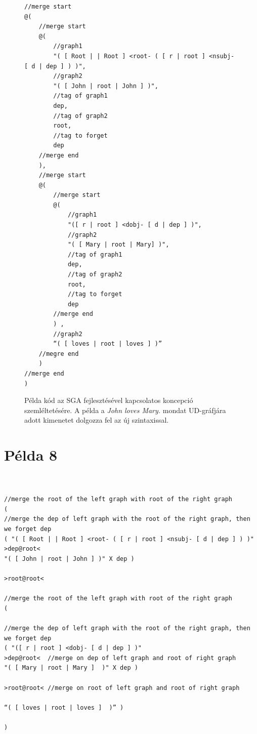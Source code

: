 \begin{figure}[h]
\begin{verbatim}
//merge start
@(																				
	//merge start
	@(																			
		//graph1
		"( [ Root | | Root ] <root- ( [ r | root ] <nsubj- [ d | dep ] ) )",	
		//graph2
	 	"( [ John | root | John ] )",
	 	//tag of graph1
		dep,							
		//tag of graph2
		root,						
		//tag to forget	
		dep							
	//merge end
	),								
	//merge start
 	@(								
 		//merge start
		@(							
			//graph1
			"([ r | root ] <dobj- [ d | dep ] )", 		
			//graph2	
			"( [ Mary | root | Mary] )",
			//tag of graph1				
			dep,						
			//tag of graph2
			root,					
			//tag to forget	
			dep						
		//merge end
		) ,							
		//graph2
		“( [ loves | root | loves ] )”
	//megre end					
	)								
//merge end
)									
\end{verbatim}
\caption{Példa kód az SGA fejlesztésével kapcsolatos koncepció szemléltetésére.
			A példa a \textit{John loves Mary.} mondat UD-gráfjára adott kimenetet dolgozza fel az új szintaxissal.}
\label{cod:example7}
\end{figure}



\section{Példa 8}
\label{sec:example8}

\begin{verbatim}


//merge the root of the left graph with root of the right graph
( 
//merge the dep of left graph with the root of the right graph, then we forget dep
( "( [ Root | | Root ] <root- ( [ r | root ] <nsubj- [ d | dep ] ) )" 
>dep@root< 
"( [ John | root | John ] )" X dep ) 

>root@root<

//merge the root of the left graph with root of the right graph
( 

//merge the dep of left graph with the root of the right graph, then we forget dep
( "([ r | root ] <dobj- [ d | dep ] )" 
>dep@root< 	//merge on dep of left graph and root of right graph
"( [ Mary | root | Mary ]  )" X	dep ) 

>root@root<	//merge on root of left graph and root of right graph

“( [ loves | root | loves ]  )” )

)
\end{verbatim}



